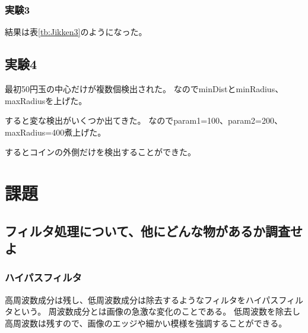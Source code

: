 \documentclass{ltjsarticle}
\begin{document}
\subsubsection{実験3}
結果は表\ref{tb:Jikken3}のようになった。
\begin{table}[htbp]
	\centering
	\caption{実験3の結果}
\end{table}

\subsection{実験4}
最初50円玉の中心だけが複数個検出された。
なのでminDistとminRadius、maxRadiusを上げた。

すると変な検出がいくつか出てきた。
なのでparam1=100、param2=200、maxRadius=400煮上げた。

するとコインの外側だけを検出することができた。

\section{課題}
\subsection{フィルタ処理について、他にどんな物があるか調査せよ\cite{Highpath}}
\subsubsection{ハイパスフィルタ}
高周波数成分は残し、低周波数成分は除去するようなフィルタをハイパスフィルタという。
周波数成分とは画像の急激な変化のことである。
低周波数を除去し高周波数は残すので、画像のエッジや細かい模様を強調することができる。
\end{document}

